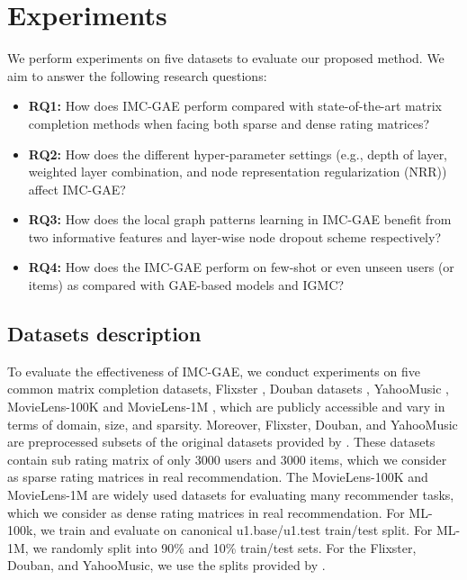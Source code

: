 \documentclass[sigconf]{acmart}
\begin{document}
\section{Experiments}
\label{sub_sec_4}
We perform experiments on five datasets to evaluate our proposed method. We aim to answer the following research questions:
\begin{itemize}[leftmargin=*]
    \item \textbf{RQ1:} How does IMC-GAE perform compared with state-of-the-art matrix completion methods when facing both sparse and dense rating matrices?
    \item \textbf{RQ2:} How does the different hyper-parameter settings (e.g., depth
of layer, weighted layer combination, and node representation regularization (NRR)) affect IMC-GAE?
    \item \textbf{RQ3:} How does the local graph patterns learning in IMC-GAE benefit from two informative features and layer-wise node dropout scheme respectively?
    \item \textbf{RQ4:} How does the IMC-GAE perform on few-shot or even unseen users (or items) as compared with GAE-based models and IGMC?
\end{itemize}

\subsection{Datasets description}
To evaluate the effectiveness of IMC-GAE, we conduct experiments on five common matrix completion datasets, Flixster \cite{jamali2010matrix}, Douban datasets \cite{ma2011recommender}, YahooMusic \cite{dror2012yahoo}, MovieLens-100K \cite{miller2003movielens} and MovieLens-1M \cite{miller2003movielens}, which are publicly accessible and vary in terms of domain, size, and sparsity. Moreover, Flixster, Douban, and YahooMusic are preprocessed subsets of the original datasets provided by \cite{monti2017geometric}. These datasets contain sub rating matrix of only 3000 users and 3000 items, which we consider as sparse rating matrices in real recommendation. The MovieLens-100K and MovieLens-1M are widely used datasets for evaluating many recommender tasks, which we consider as dense rating matrices in real recommendation. For ML-100k, we train and evaluate on canonical u1.base/u1.test train/test split. For ML-1M, we randomly split into 90\% and 10\% train/test sets. For the Flixster, Douban, and YahooMusic, we use the splits provided by \cite{monti2017geometric}. 
\end{document}
